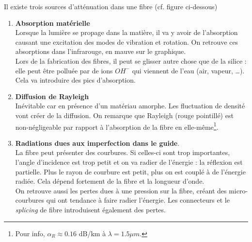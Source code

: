 	Il existe trois sources d'atténuation dans une fibre (cf. figure ci-dessous)
	\begin{enumerate}
	\item  \textbf{Absorption matérielle}\\
	Lorsque la lumière se propage dans la matière, il va y avoir de l'absorption causant
	une excitation des modes de vibration et rotation. On retrouve ces absorptions dans 
	l'infrarouge, en mauve sur le graphique.\\
	
	Lors de la fabrication des fibres, il peut se glisser autre chose que de la silice : 
	elle peut être polluée par de ions $OH^-$ qui viennent de l'eau (air, vapeur, \dots). 
	Cela va introduire des pics d'absorption.\\
	
	\item \textbf{Diffusion de Rayleigh}\\
	Inévitable car en présence d'un matériau amorphe. Les fluctuation de densité vont créer
	de la diffusion. On remarque que Rayleigh (rouge pointillé) est non-négligeable par 
	rapport à l'absorption de la fibre en elle-même\footnote{Pour info, $\alpha_R \approx 0.16$
	dB/km à $\lambda = 1.5\mu m$.}.\\
	
	\item \textbf{Radiations dues aux imperfection dans le guide}.\\
	La fibre peut présenter des courbures. Si celles-ci sont trop importantes, l'angle d'incidence
	est trop petit et on va radier de l'énergie : la réflexion est partielle. Plus le rayon de 
	courbure est petit, plus on est couplé à de l'énergie radiée. Cela dépend fortement de la fibre
	et la longueur d'onde.	\\
	
	On retrouve aussi les pertes dues à une pression sur la fibre, créant des micro-courbures
	qui ont tendance à faire radier l'énergie. Les connecteurs et le \textit{splicing} de fibre
	introduisent également des pertes.
	\end{enumerate}

